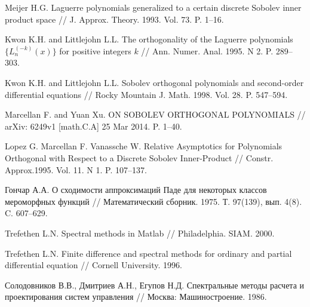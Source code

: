 \begin{thebibliography}{999}

 Meijer H.G. Laguerre polynomials generalized to a certain discrete Sobolev inner product space // J. Approx. Theory. 1993. Vol. 73. P. 1--16.




 Kwon K.H. and Littlejohn L.L. The orthogonality of the Laguerre polynomials $\{L_n^{(-k)}(x)\}$ for positive integers $k$ // Ann. Numer. Anal. 1995. N 2. P. 289--303.




 Kwon K.H. and Littlejohn L.L. Sobolev orthogonal polynomials and second-order differential equations // Rocky Mountain J. Math. 1998. Vol. 28. P. 547--594.




 Marcellan F. and Yuan Xu. ON SOBOLEV ORTHOGONAL POLYNOMIALS // arXiv: 6249v1 [math.C.A] 25 Mar 2014. P. 1--40.




 Lopez G. Marcellan F. Vanassche W. Relative Asymptotics for Polynomials Orthogonal with Respect to a Discrete Sobolev Inner-Product // Constr. Approx.1995. Vol. 11. N 1. P. 107--137.




 Гончар А.А. О сходимости аппроксимаций Паде для некоторых классов мероморфных функций // Математический сборник. 1975. Т. 97(139), вып. 4(8). C. 607--629.




 Trefethen L.N. Spectral methods in Matlab // Philadelphia. SIAM. 2000.




 Trefethen L.N. Finite difference and spectral methods for ordinary and partial differential equation // Cornell University. 1996.




Солодовников В.В., Дмитриев А.Н., Егупов Н.Д. Спектральные методы расчета и проектирования систем управления // Москва: Машиностроение. 1986.




\end{thebibliography}

